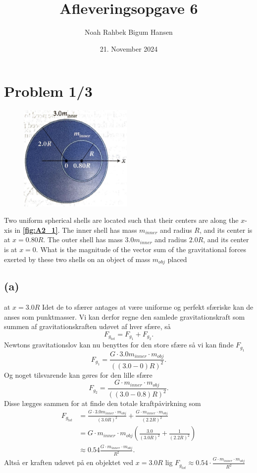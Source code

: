 \documentclass[12pt]{article}
\title{Afleveringsopgave 6}
\author{Noah Rahbek Bigum Hansen}
\date{21. November 2024}
\theoremstyle{definition}
\begin{document}
\maketitle

\section*{Problem 1/3}

\begin{figure}
  \vspace{-40pt}
  \includegraphics[width=5.5cm]{../figures/A2_1.png}
  \caption{}
  \label{fig:A2_1}
\end{figure}

Two uniform spherical shells are located such that their centers are along the $x$-xis in \textbf{\autoref{fig:A2_1}}. The inner shell has mass $m_{inner}$ and radius $R$, and its center is at $x = \num{0,80}R$. The outer shell has mass $\num{3,0} m_{inner}$ and radius $\num{2,0} R$, and its center is at $x = 0$. What is the magnitude of the vector sum of the gravitational forces exerted by these two shells on an object of mass $m_{obj}$ placed

\subsection*{(a)}
at $x = \num{3,0} R$
\bigbreak
Idet de to sfærer antages at være uniforme og perfekt sfæriske kan de anses som punktmasser. Vi kan derfor regne den samlede gravitationskraft som summen af gravitationskraften udøvet af hver sfære, så
\[ 
F_{g_{tot}} = F_{g_{1}} + F_{g_{2}}
.\]
Newtons gravitationslov kan nu benyttes for den store sfære så vi kan finde $F_{g_1}$
\[ 
F_{g_1} = \frac{G \cdot \num{3,0} m_{inner} \cdot m_{obj}}{((\num{3,0} - 0)R)^2} 
.\]
Og noget tilsvarende kan gøres for den lille sfære
\[ 
F_{g_2} = \frac{G \cdot m_{inner} \cdot m_{obj}}{((\num{3,0} - \num{0,8})R)^2 }
.\]
Disse lægges sammen for at finde den totale kraftpåvirkning som
\begin{align*}
  F_{g_{tot}} &=   \frac{G \cdot \num{3,0} m_{inner} \cdot m_{obj}}{(\num{3,0}R)^2} + \frac{G \cdot m_{inner} \cdot m_{obj}}{(\num{2,2}R)^2} \\
  &= G\cdot m_{inner} \cdot m_{obj} \left( \frac{\num{3,0}}{(\num{3,0}R)^2} + \frac{1}{(\num{2,2}R)^2} \right) \\
  &\approx \num{0,54} \frac{G\cdot m_{inner} \cdot m_{obj}}{R^2}
.\end{align*}
Altså er kraften udøvet på en objektet ved $x = \num{3,0}R$ lig \underline{\underline{$F_{g_{tot}} \approx \num{0,54} \cdot \frac{G\cdot m_{inner} \cdot m_{obj}}{R^2}$ }}
\end{document}
